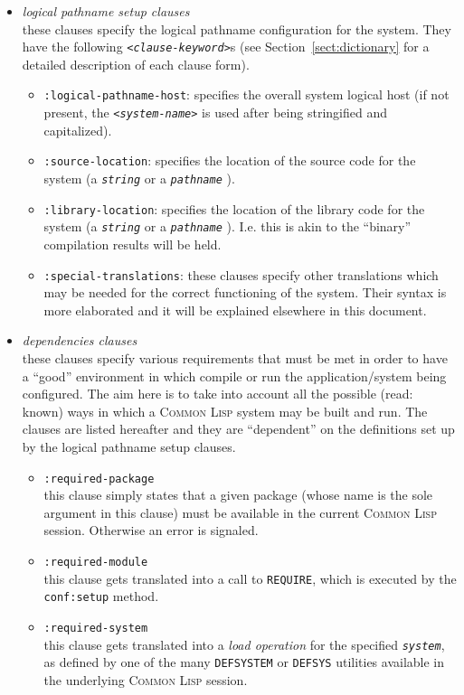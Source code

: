 \documentclass{article}
\newcommand{\CL}{\textsc{Common Lisp}}
\newcommand{\notimpl}{\ddag}
\newcommand{\code}[1]{\texttt{#1}}
\newcommand{\clobject}[1]{\texttt{\textit{#1}}} %
\begin{document}
\begin{itemize}
\item	\emph{logical pathname setup clauses}\\
	these clauses specify the logical pathname configuration for
	the system. They have the following
	\code{\emph{<clause-keyword>}}s (see Section~\ref{sect:dictionary} for
	a detailed description of each clause form).
	\begin{itemize}
	\item	\code{:logical-pathname-host}: specifies the overall
		system logical host (if not present, the
		\code{\emph{<system-name>}} is used after being
		stringified and capitalized).

	\item	\code{:source-location}: specifies the location of the
		source code for the system (a \clobject{string} or a
		\clobject{pathname} \notimpl{}).

	\item	\code{:library-location}: specifies the location of the
		library code for the system (a \clobject{string} or a
		\clobject{pathname} \notimpl{}). I.e. this is akin to
		the ``binary'' compilation results will be held.

	\item	\code{:special-translations}: these clauses specify
		other translations which may be needed for the
		correct functioning of the system.  Their syntax is
		more elaborated and it will be explained elsewhere in
		this document.
	\end{itemize}

\item	\emph{dependencies clauses}\\
	these clauses specify various requirements that must be met in
	order to have a ``good'' environment in which compile or run
	the application/system being configured.  The aim here is to
	take into account all the possible (read: known) ways in which
	a \CL{} system may be built and run.  The clauses are listed
	hereafter and they are ``dependent'' on the definitions set up
	by the logical pathname setup clauses.
	\begin{itemize}
	\item	\code{:required-package}\\
		this clause simply states that a given package (whose
		name is the sole argument in this clause) must be
		available in the current \CL{} session.  Otherwise an
		error is signaled.

	\item	\code{:required-module}\\
		this clause gets translated into a call to
		\code{REQUIRE}, which is executed by the
		\code{conf:setup} method.

	\item	\code{:required-system}\\
		this clause gets translated into a \emph{load
		operation} for the specified \clobject{system}, as
		defined by one of the many \code{DEFSYSTEM} or
		\code{DEFSYS} utilities available in the underlying
		\CL{} session.
	\end{itemize}

\end{itemize}
\end{document}
